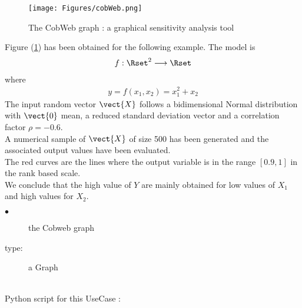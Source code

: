 \begin{figure}[H]
  \begin{center}
    \texttt{[image: Figures/cobWeb.png]}
    \caption{The CobWeb graph : a graphical sensitivity analysis tool}
    \label{CobWeb}
  \end{center}
\end{figure}


Figure (\ref{CobWeb}) has been obtained for the following example. The model is
\begin{align*}
  f : \Rset^2 \longrightarrow  \Rset
\end{align*}
where
\begin{align*}
  y = f(x_1, x_2)  = x_1^2 + x_2
\end{align*}
The input random vector $\vect{X}$ follows a bidimensional Normal distribution with $\vect{0}$ mean, a reduced standard deviation vector and a correlation factor $\rho = -0.6$.\\
A numerical sample of $\vect{X}$ of size 500 has been generated and the associated output values have been evaluated.\\
The red curves are the lines where the output variable is in the range $[0.9, 1]$ in the rank based scale.\\
We conclude that the high value of $Y$ are mainly obtained for low values of $X_1$ and high values for $X_2$.\\


             {
               \begin{description}
               \item[$\bullet$] the Cobweb graph
               \item[type:] a Graph
               \end{description}
             }

             \textspace\\

             Python  script for this UseCase :

